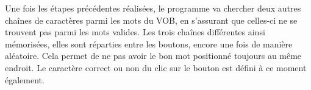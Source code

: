Une fois les étapes précédentes réalisées, le programme va chercher deux autres chaînes de caractères parmi les mots du VOB, en s'assurant que celles-ci ne se trouvent pas parmi les mots valides. Les trois chaînes différentes ainsi mémorisées, elles sont réparties entre les boutons, encore une fois de manière aléatoire. Cela permet de ne pas avoir le bon mot positionné toujours au même endroit. Le caractère correct ou non du clic sur le bouton est défini à ce moment également.\\

